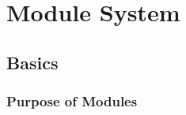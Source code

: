 %
% 
% 
% 
% 
\chapter{Module System}
\label{modules}
\label{chapmodules}

\section{Basics}
\subsection{Purpose of Modules}

